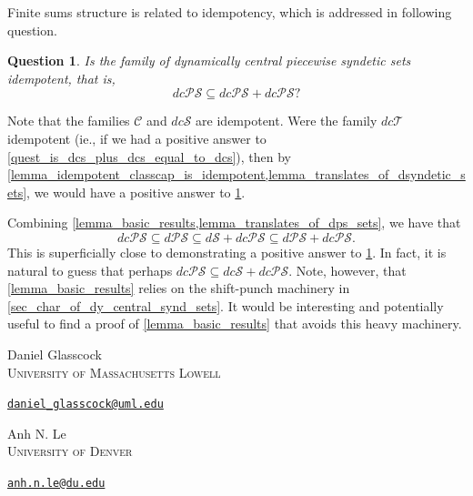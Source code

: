 \documentclass[letter,11pt]{article}
\theoremstyle{plain}
\newtheorem{question}[theorem]{Question}
\theoremstyle{definition}
\theoremstyle{plain}
\theoremstyle{plain}
\numberwithin{equation}{section}
\newcommand{\dsyndetic}{d\mathcal{S}}
\newcommand{\dcsyndetic}{dc\mathcal{S}}
\newcommand{\dcthick}{dc\mathcal{T}}
\newcommand{\dPS}{d\mathcal{PS}}
\newcommand{\dcPS}{dc\mathcal{PS}}
\newcommand{\central}{\mathcal{C}}
\begin{document}
Finite sums structure is related to idempotency, which is addressed in following question.

\begin{question}
    \label{quest_is_dcps_idempotent}
    Is the family of dynamically central piecewise syndetic sets idempotent, that is,
    \[\dcPS \subseteq \dcPS + \dcPS?\]
\end{question}

Note that the families $\central$ and $\dcsyndetic$ are idempotent. Were the family $\dcthick$ idempotent (ie., if we had a positive answer to \cref{quest_is_dcs_plus_dcs_equal_to_dcs}), then by \cref{lemma_idempotent_classcap_is_idempotent,lemma_translates_of_dsyndetic_sets}, we would have a positive answer to \cref{quest_is_dcps_idempotent}.

Combining \cref{lemma_basic_results,lemma_translates_of_dps_sets}, we have that
\[\dcPS \subseteq \dPS \subseteq \dsyndetic + \dcPS \subseteq \dPS + \dcPS.\]
This is superficially close to demonstrating a positive answer to \cref{quest_is_dcps_idempotent}.  In fact, it is natural to guess that perhaps $\dcPS \subseteq \dcsyndetic + \dcPS$.  Note, however, that \cref{lemma_basic_results} relies on the shift-punch machinery in \cref{sec_char_of_dy_central_synd_sets}.  It would be interesting and potentially useful to find a proof of \cref{lemma_basic_results} that avoids this heavy machinery.





\bigskip
\bigskip
\footnotesize
\noindent
Daniel Glasscock\\
\textsc{University of Massachusetts Lowell}\par\nopagebreak
\noindent
\href{mailto:daniel_glasscock@uml.edu}
{\texttt{daniel{\_}glasscock@uml.edu}}

\bigskip
\noindent
Anh N. Le\\
\textsc{University of Denver}\par\nopagebreak
\noindent
\href{mailto:daniel_glasscock@uml.edu}
{\texttt{anh.n.le@du.edu}}
\end{document}
